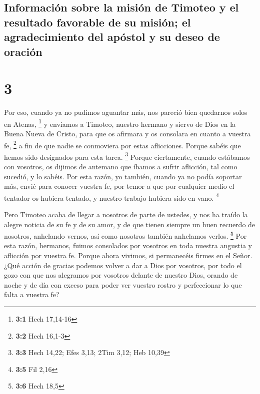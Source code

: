 \hypertarget{informaciuxf3n-sobre-la-misiuxf3n-de-timoteo-y-el-resultado-favorable-de-su-misiuxf3n-el-agradecimiento-del-apuxf3stol-y-su-deseo-de-oraciuxf3n}{%
\subsection{Información sobre la misión de Timoteo y el resultado
favorable de su misión; el agradecimiento del apóstol y su deseo de
oración}\label{informaciuxf3n-sobre-la-misiuxf3n-de-timoteo-y-el-resultado-favorable-de-su-misiuxf3n-el-agradecimiento-del-apuxf3stol-y-su-deseo-de-oraciuxf3n}}

\hypertarget{section-2}{%
\section{3}\label{section-2}}

 Por eso, cuando ya no pudimos aguantar más, nos pareció
bien quedarnos solos en Atenas, \footnote{\textbf{3:1} Hech 17,14-16}
 y enviamos a Timoteo, nuestro hermano y siervo de Dios en
la Buena Nueva de Cristo, para que os afirmara y os consolara en cuanto
a vuestra fe, \footnote{\textbf{3:2} Hech 16,1-3}  a fin
de que nadie se conmoviera por estas aflicciones. Porque sabéis que
hemos sido designados para esta tarea. \footnote{\textbf{3:3} Hech
  14,22; Efes 3,13; 2Tim 3,12; Heb 10,39}  Porque
ciertamente, cuando estábamos con vosotros, os dijimos de antemano que
íbamos a sufrir aflicción, tal como sucedió, y lo sabéis. 
Por esta razón, yo también, cuando ya no podía soportar más, envié para
conocer vuestra fe, por temor a que por cualquier medio el tentador os
hubiera tentado, y nuestro trabajo hubiera sido en vano. \footnote{\textbf{3:5}
  Fil 2,16}

 Pero Timoteo acaba de llegar a nosotros de parte de
ustedes, y nos ha traído la alegre noticia de su fe y de su amor, y de
que tienen siempre un buen recuerdo de nosotros, anhelando vernos, así
como nosotros también anhelamos verlos. \footnote{\textbf{3:6} Hech 18,5}
 Por esta razón, hermanos, fuimos consolados por vosotros
en toda nuestra angustia y aflicción por vuestra fe. 
Porque ahora vivimos, si permanecéis firmes en el Señor. 
¿Qué acción de gracias podemos volver a dar a Dios por vosotros, por
todo el gozo con que nos alegramos por vosotros delante de nuestro Dios,
 orando de noche y de día con exceso para poder ver
vuestro rostro y perfeccionar lo que falta a vuestra fe?


